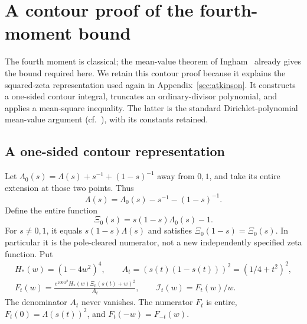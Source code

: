 \documentclass[11pt,a4paper]{article}
\numberwithin{equation}{section}
\theoremstyle{definition}
\begin{document}
\appendix
\section{A contour proof of the fourth-moment bound}
\label{sec:fourth}
The fourth moment is classical; the mean-value theorem of
Ingham~\cite{ingham28} already gives the bound required here. We retain this
contour proof because it explains the squared-zeta representation used again
in Appendix~\ref{sec:atkinson}. It constructs a one-sided contour integral,
truncates an ordinary-divisor polynomial, and applies a mean-square inequality.
The latter is the standard Dirichlet-polynomial mean-value argument
(cf.~\cite{ik}), with its constants retained.

\subsection{A one-sided contour representation}
Let $\Lambda_0(s)=\Lambda(s)+s^{-1}+(1-s)^{-1}$ away from $0,1$,
and take its entire extension at those two points. Thus
\[
 \Lambda(s)=\Lambda_0(s)-s^{-1}-(1-s)^{-1}.
\]
Define the entire function
\[
 \Xi_0(s)=s(1-s)\Lambda_0(s)-1.
\]
For $s\ne0,1$, it equals $s(1-s)\Lambda(s)$ and satisfies
$\Xi_0(1-s)=\Xi_0(s)$. In particular it is the pole-cleared numerator, not a
new independently specified zeta function. Put
\begin{gather*}
 H_*(w)=(1-4w^2)^4,\qquad A_t=(s(t)(1-s(t)))^2=(1/4+t^2)^2,\\
 F_t(w)=\frac{e^{100w^2}H_*(w)\Xi_0(s(t)+w)^2}{A_t},\qquad
 \mathscr I_t(w)=F_t(w)/w.
\end{gather*}
The denominator $A_t$ never vanishes. The numerator $F_t$ is entire,
$F_t(0)=\Lambda(s(t))^2$, and $F_t(-w)=F_{-t}(w)$.
\end{document}
